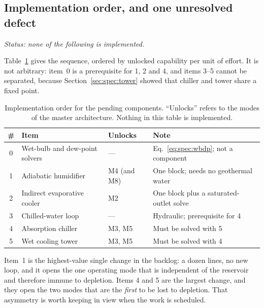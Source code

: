 \documentclass[11pt]{article}
\begin{document}
\subsection{Implementation order, and one unresolved defect}
\label{sec:spec:order}

\emph{Status: none of the following is implemented.}

Table~\ref{tab:spec:order} gives the sequence, ordered by unlocked capability per unit of effort. It
is not arbitrary: item~0 is a prerequisite for 1, 2 and 4, and items 3--5 cannot be separated,
because Section~\ref{sec:spec:tower} showed that chiller and tower share a fixed point.

\begin{table}[htbp]
\centering
\caption{Implementation order for the pending components. ``Unlocks'' refers to the modes of the
master architecture. Nothing in this table is implemented.}
\label{tab:spec:order}
\begin{tabular}{@{}clll@{}}
\toprule
\# & Item & Unlocks & Note \\
\midrule
0 & Wet-bulb and dew-point solvers & --- & Eq.~\eqref{eq:spec:wbdp}; not a component \\
1 & Adiabatic humidifier & M4 (and M8) & One block; needs no geothermal water \\
2 & Indirect evaporative cooler & M2 & One block plus a saturated-outlet solve \\
3 & Chilled-water loop & --- & Hydraulic; prerequisite for 4 \\
4 & Absorption chiller & M3, M5 & Must be solved with 5 \\
5 & Wet cooling tower & M3, M5 & Must be solved with 4 \\
\bottomrule
\end{tabular}
\end{table}

Item~1 is the highest-value single change in the backlog: a dozen lines, no new loop, and it opens
the one operating mode that is independent of the reservoir and therefore immune to depletion. Items
4 and 5 are the largest change, and they open the two modes that are the \emph{first} to be lost to
depletion. That asymmetry is worth keeping in view when the work is scheduled.
\end{document}
